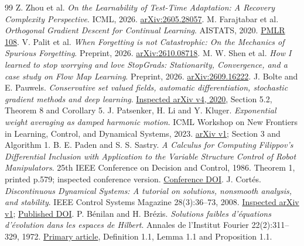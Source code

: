 \documentclass[11pt,a4paper]{article}
\begin{document}
\begin{thebibliography}{99}
 Z. Zhou et al. \emph{On the Learnability of Test-Time
Adaptation: A Recovery Complexity Perspective}. ICML, 2026.
\href{https://arxiv.org/abs/2605.28057}{arXiv:2605.28057}.
 M. Farajtabar et al. \emph{Orthogonal Gradient Descent for
Continual Learning}. AISTATS, 2020.
\href{https://proceedings.mlr.press/v108/farajtabar20a.html}{PMLR 108}.
 V. Palit et al. \emph{When Forgetting is not Catastrophic:
On the Mechanics of Spurious Forgetting}. Preprint, 2026.
\href{https://arxiv.org/abs/2610.08718}{arXiv:2610.08718}.
 M. W. Shen et al. \emph{How I learned to stop worrying
and love StopGrads: Stationarity, Convergence, and a case study on Flow Map
Learning}. Preprint, 2026.
\href{https://arxiv.org/abs/2609.16222}{arXiv:2609.16222}.
 J. Bolte and E. Pauwels.
\emph{Conservative set valued fields, automatic differentiation,
stochastic gradient methods and deep learning}.
\href{https://arxiv.org/abs/1909.10300v4}{Inspected arXiv v4, 2020},
Section 5.2, Theorem 8 and Corollary 5.
 J. Patsenker, H. Li and Y. Kluger.
\emph{Exponential weight averaging as damped harmonic motion}.
ICML Workshop on New Frontiers in Learning, Control, and Dynamical Systems, 2023.
\href{https://arxiv.org/abs/2310.13854v1}{arXiv v1}; Section 3 and Algorithm 1.
 B. E. Paden and S. S. Sastry.
\emph{A Calculus for Computing Filippov's Differential Inclusion with
Application to the Variable Structure Control of Robot Manipulators}.
25th IEEE Conference on Decision and Control, 1986.
Theorem 1, printed p.579; inspected conference version.
\href{https://doi.org/10.1109/CDC.1986.267369}{Conference DOI}.
 J. Cort\'es. \emph{Discontinuous Dynamical Systems:
A tutorial on solutions, nonsmooth analysis, and stability}.
IEEE Control Systems Magazine 28(3):36--73, 2008.
\href{https://arxiv.org/abs/0901.3583v1}{Inspected arXiv v1};
\href{https://doi.org/10.1109/MCS.2008.919306}{Published DOI}.
 P. B\'enilan and H. Br\'ezis.
\emph{Solutions faibles d'\'equations d'\'evolution dans les espaces de Hilbert}.
Annales de l'Institut Fourier 22(2):311--329, 1972.
\href{https://aif.centre-mersenne.org/item/AIF_1972__22_2_311_0/}{Primary article},
Definition 1.1, Lemma 1.1 and Proposition 1.1.
\end{thebibliography}
\end{document}

